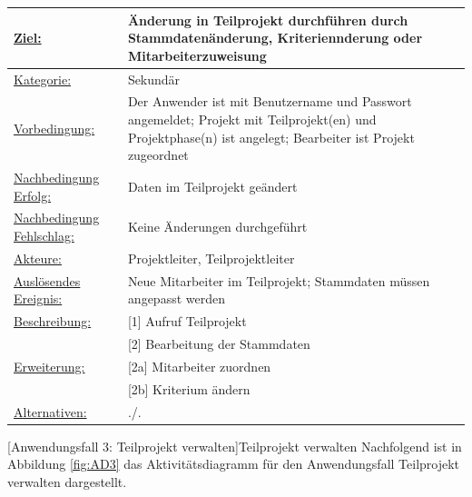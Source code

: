 \begin{tabularx}{\textwidth}{|p{}|p{}|}
        \hline
        \underline{Ziel:} & Änderung in Teilprojekt durchführen durch Stammdatenänderung, Kriteriennderung oder Mitarbeiterzuweisung \\\hline
        \underline{Kategorie:} & Sekundär\\\hline
        \underline{Vorbedingung:} & Der Anwender ist mit Benutzername und Passwort angemeldet; Projekt mit Teilprojekt(en) und Projektphase(n) ist angelegt; Bearbeiter ist Projekt zugeordnet\\\hline
        \underline{Nachbedingung Erfolg:} & Daten im Teilprojekt geändert \\\hline
        \underline{Nachbedingung Fehlschlag:} & Keine Änderungen durchgeführt \\\hline
        \underline{Akteure:} & Projektleiter, Teilprojektleiter \\\hline
        \underline{Auslösendes Ereignis:} & Neue Mitarbeiter im Teilprojekt; Stammdaten müssen angepasst werden\\\hline        
        \multirow{1}{*}{\underline{Beschreibung:}} & [1] Aufruf Teilprojekt\\
        & [2] Bearbeitung der Stammdaten\\\hline
        \multirow{1}{*}{\underline{Erweiterung:}} & [2a] Mitarbeiter zuordnen\\
        & [2b] Kriterium ändern\\\hline
        \underline{Alternativen:} & ./. \\\hline
\end{tabularx}
[Anwendungsfall 3: Teilprojekt verwalten]{Teilprojekt verwalten}
\newpage
Nachfolgend ist in Abbildung \ref{fig:AD3} das Aktivitätsdiagramm für den Anwendungsfall \glqq{}Teilprojekt verwalten\grqq{} dargestellt.
